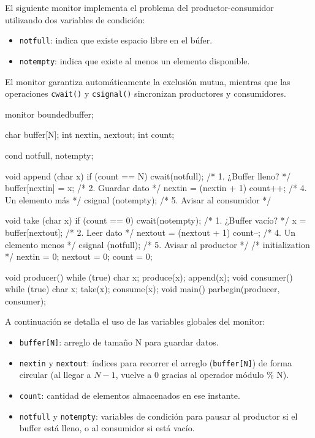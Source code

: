 El siguiente monitor implementa el problema del productor-consumidor utilizando dos variables de condición:

\begin{itemize}
  \item \texttt{notfull}: indica que existe espacio libre en el búfer.
  \item \texttt{notempty}: indica que existe al menos un elemento disponible.
\end{itemize}

El monitor garantiza automáticamente la exclusión mutua, mientras que las operaciones \texttt{cwait()} y \texttt{csignal()} sincronizan productores y consumidores.

\begin{ccode}[title=Procedimientos y variables del monitor]
monitor boundedbuffer;

char buffer[N];
int nextin, nextout;
int count;

cond notfull, notempty;

void append (char x) {
  if (count == N) cwait(notfull);  /* 1. ¿Buffer lleno? */
  buffer[nextin] = x;              /* 2. Guardar dato */
  nextin = (nextin + 1) %
  count++;                         /* 4. Un elemento más */
  csignal (notempty);              /* 5. Avisar al consumidor */
}

void take (char x) {
  if (count == 0) cwait(notempty); /* 1. ¿Buffer vacío? */
  x = buffer[nextout];             /* 2. Leer dato */
  nextout = (nextout + 1) %
  count--;                         /* 4. Un elemento menos */
  csignal (notfull);               /* 5. Avisar al productor */
}
/* initialization */
{
  nextin = 0;
  nextout = 0;
  count = 0;
}
\end{ccode}
\begin{ccode}[title=Productor consumidor usando monitor]
void producer() {
  while (true) {
    char x;
    produce(x);
    append(x);
  }
}
void consumer() {
  while (true) {
    char x;
    take(x);
    consume(x);
  }
}
void main() {
  parbegin(producer, consumer);
}
\end{ccode}

A continuación se detalla el uso de las variables globales del monitor:
\begin{itemize}
  \item \texttt{buffer[N]}: arreglo de tamaño N para guardar datos.
  \item \texttt{nextin} y \texttt{nextout}: índices para recorrer el arreglo (\texttt{buffer[N]}) de forma circular (al llegar a \(N-1\), vuelve a 0 gracias al operador módulo \% N).
  \item \texttt{count}: cantidad de elementos almacenados en ese instante.
  \item \texttt{notfull} y \texttt{notempty}: variables de condición para pausar al productor si el buffer está lleno, o al consumidor si está vacío.
\end{itemize}

